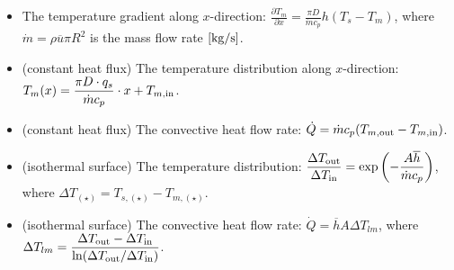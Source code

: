 \documentclass[10pt, a4paper, table]{article}
\begin{document}
\begin{mdframed}
\begin{itemize}
    \item The temperature gradient along $x$-direction: $\displaystyle \frac{\partial T_m}{\partial x} = \frac{\pi D}{\dot{m} c_p} h (T_s - T_m)$, where $\dot{m} = \rho \overline{u} \pi R^2$ is the mass flow rate $[\rm kg/s]$.

    \item (constant heat flux) The temperature distribution along $x$-direction: $\displaystyle T_m(x) = \frac{\pi D \cdot q_s}{\dot{m} c_p} \cdot x + T_{m, {\rm in}}$.

    \item (constant heat flux) The convective heat flow rate: $\displaystyle \dot{Q} = \dot{m} c_p (T_{m,{\rm out}} - T_{m, {\rm in}})$.

    \item (isothermal surface) The temperature distribution: $\displaystyle \frac{\Delta T_{\rm out}}{\Delta T_{\rm in}} = \exp\left( - \frac{A \overline{h}}{\dot{m} c_p} \right)$, where $\Delta T_{(\star)} = T_{s,(\star)} - T_{m,(\star)}$.

    \item (isothermal surface) The convective heat flow rate: $\displaystyle \dot{Q} = \overline{h} A \Delta T_{lm}$, where $\displaystyle \Delta T_{lm} = \frac{\Delta T_{\rm out} - \Delta T_{\rm in}}{\ln (\Delta T_{\rm out}/\Delta T_{\rm in})}$.
\end{itemize}
\end{mdframed}
\end{document}
